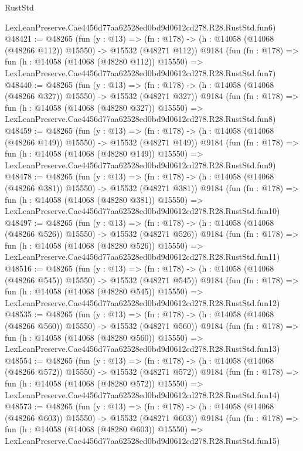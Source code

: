\begin{lexlean}{RustStd}
\begin{coremodule}
    LexLeanPreserve.Cae4456d77aa62528ed0bd9d0612cd278.R28.RustStd.fun6)
@48421 := @48265
    (fun (y : @13) =>
    (fn : @178) -> (h : @14058 (@14068 (@48266 @112)) @15550) -> @15532 (@48271 @112))
    @9184
    (fun (fn : @178) =>
    fun (h : @14058 (@14068 (@48280 @112)) @15550) =>
    LexLeanPreserve.Cae4456d77aa62528ed0bd9d0612cd278.R28.RustStd.fun7)
@48440 := @48265
    (fun (y : @13) =>
    (fn : @178) -> (h : @14058 (@14068 (@48266 @327)) @15550) -> @15532 (@48271 @327))
    @9184
    (fun (fn : @178) =>
    fun (h : @14058 (@14068 (@48280 @327)) @15550) =>
    LexLeanPreserve.Cae4456d77aa62528ed0bd9d0612cd278.R28.RustStd.fun8)
@48459 := @48265
    (fun (y : @13) =>
    (fn : @178) -> (h : @14058 (@14068 (@48266 @149)) @15550) -> @15532 (@48271 @149))
    @9184
    (fun (fn : @178) =>
    fun (h : @14058 (@14068 (@48280 @149)) @15550) =>
    LexLeanPreserve.Cae4456d77aa62528ed0bd9d0612cd278.R28.RustStd.fun9)
@48478 := @48265
    (fun (y : @13) =>
    (fn : @178) -> (h : @14058 (@14068 (@48266 @381)) @15550) -> @15532 (@48271 @381))
    @9184
    (fun (fn : @178) =>
    fun (h : @14058 (@14068 (@48280 @381)) @15550) =>
    LexLeanPreserve.Cae4456d77aa62528ed0bd9d0612cd278.R28.RustStd.fun10)
@48497 := @48265
    (fun (y : @13) =>
    (fn : @178) -> (h : @14058 (@14068 (@48266 @526)) @15550) -> @15532 (@48271 @526))
    @9184
    (fun (fn : @178) =>
    fun (h : @14058 (@14068 (@48280 @526)) @15550) =>
    LexLeanPreserve.Cae4456d77aa62528ed0bd9d0612cd278.R28.RustStd.fun11)
@48516 := @48265
    (fun (y : @13) =>
    (fn : @178) -> (h : @14058 (@14068 (@48266 @545)) @15550) -> @15532 (@48271 @545))
    @9184
    (fun (fn : @178) =>
    fun (h : @14058 (@14068 (@48280 @545)) @15550) =>
    LexLeanPreserve.Cae4456d77aa62528ed0bd9d0612cd278.R28.RustStd.fun12)
@48535 := @48265
    (fun (y : @13) =>
    (fn : @178) -> (h : @14058 (@14068 (@48266 @560)) @15550) -> @15532 (@48271 @560))
    @9184
    (fun (fn : @178) =>
    fun (h : @14058 (@14068 (@48280 @560)) @15550) =>
    LexLeanPreserve.Cae4456d77aa62528ed0bd9d0612cd278.R28.RustStd.fun13)
@48554 := @48265
    (fun (y : @13) =>
    (fn : @178) -> (h : @14058 (@14068 (@48266 @572)) @15550) -> @15532 (@48271 @572))
    @9184
    (fun (fn : @178) =>
    fun (h : @14058 (@14068 (@48280 @572)) @15550) =>
    LexLeanPreserve.Cae4456d77aa62528ed0bd9d0612cd278.R28.RustStd.fun14)
@48573 := @48265
    (fun (y : @13) =>
    (fn : @178) -> (h : @14058 (@14068 (@48266 @603)) @15550) -> @15532 (@48271 @603))
    @9184
    (fun (fn : @178) =>
    fun (h : @14058 (@14068 (@48280 @603)) @15550) =>
    LexLeanPreserve.Cae4456d77aa62528ed0bd9d0612cd278.R28.RustStd.fun15)

\end{coremodule}
\end{lexlean}
